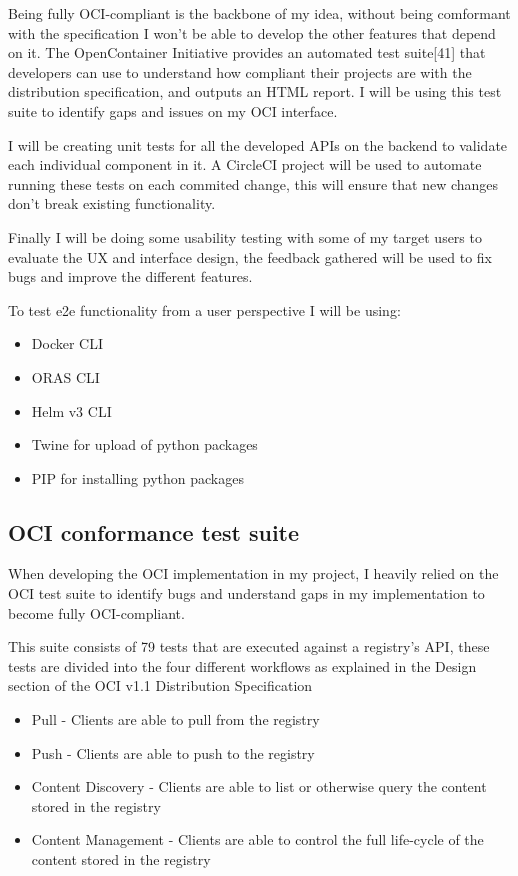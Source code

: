 \documentclass{article}
\begin{document}
  Being fully OCI-compliant is the backbone of my idea, without being comformant with the specification I won't be able to develop the other features that depend on it. The OpenContainer Initiative provides an automated test suite[41] that developers can use to understand how compliant their projects are with the distribution specification, and outputs an HTML report. I will be using this test suite to identify gaps and issues on my OCI interface.

  I will be creating unit tests for all the developed APIs on the backend to validate each individual component in it. A CircleCI project will be used to automate running these tests on each commited change, this will ensure that new changes don't break existing functionality.

  Finally I will be doing some usability testing with some of my target users to evaluate the UX and interface design, the feedback gathered will be used to fix bugs and improve the different features.

  To test e2e functionality from a user perspective I will be using:

  \begin{itemize}
    \item Docker CLI
    \item ORAS CLI
    \item Helm v3 CLI
    \item Twine for upload of python packages
    \item PIP for installing python packages
  \end{itemize}

  \subsection{OCI conformance test suite}

  When developing the OCI implementation in my project, I heavily relied on the OCI test suite to identify bugs and understand gaps in my implementation to become fully OCI-compliant.

  This suite consists of 79 tests that are executed against a registry's API, these tests are divided into the four different workflows as explained in the Design section of the OCI v1.1 Distribution Specification

  \begin{itemize}
    \item Pull - Clients are able to pull from the registry
    \item Push - Clients are able to push to the registry
    \item Content Discovery - Clients are able to list or otherwise query the content stored in the registry
    \item Content Management - Clients are able to control the full life-cycle of the content stored in the registry
  \end{itemize}
  
\end{document}
